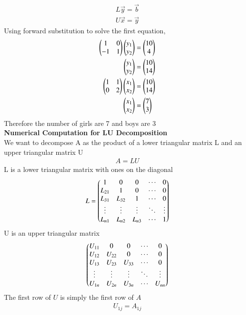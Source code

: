 \documentclass[journal]{IEEEtran}
\numberwithin{equation}{enumi}
\numberwithin{figure}{enumi}
\begin{document}
\begin{align}
    L\vec{y} = \vec{b}\\
    U\vec{x} = \vec{y}
\end{align}
Using forward substitution to solve the first equation,
\begin{align}
    \begin{pmatrix}1&0\\-1&1\end{pmatrix}\begin{pmatrix}y_1\\y_2\end{pmatrix}&=\begin{pmatrix}10\\4\end{pmatrix}\\
    \begin{pmatrix}y_1\\y_2\end{pmatrix}&=\begin{pmatrix}10\\14\end{pmatrix}\\
    \begin{pmatrix}1&1\\0&2\end{pmatrix}\begin{pmatrix}x_1\\x_2\end{pmatrix}&=\begin{pmatrix}10\\14\end{pmatrix}\\
    \begin{pmatrix}x_1\\x_2\end{pmatrix}&=\begin{pmatrix}7\\3\end{pmatrix}
\end{align}
Therefore the number of girls are 7 and boys are 3\\
\textbf{Numerical Computation for LU Decomposition}\\
We want to decompose A as the product of a lower triangular matrix L and an upper triangular matrix U  
\begin{align}
    A = LU
\end{align}
L is a lower triangular matrix with ones on the diagonal
\begin{align}
    L = \begin{pmatrix}1 & 0 & 0 & \cdots & 0 \\
L_{21} & 1 & 0 & \cdots & 0 \\
L_{31} & L_{32} & 1 & \cdots & 0 \\
\vdots & \vdots & \vdots & \ddots & \vdots \\
L_{n1} & L_{n2} & L_{n3} & \cdots & 1\end{pmatrix}
\end{align}
U is an upper triangular matrix
\begin{align}
    \begin{pmatrix}U_{11} & 0 & 0 & \cdots & 0 \\
U_{12} & U_{22} & 0 & \cdots & 0 \\
U_{13} & U_{23} & U_{33} & \cdots & 0 \\
\vdots & \vdots & \vdots & \ddots & \vdots \\
U_{1n} & U_{2n} & U_{3n} & \cdots & U_{nn}\end{pmatrix}
\end{align}
The first row of $U$ is simply the first row of $A$
\begin{align}
    U_{1j} = A_{1j} 
\end{align}
\end{document}
